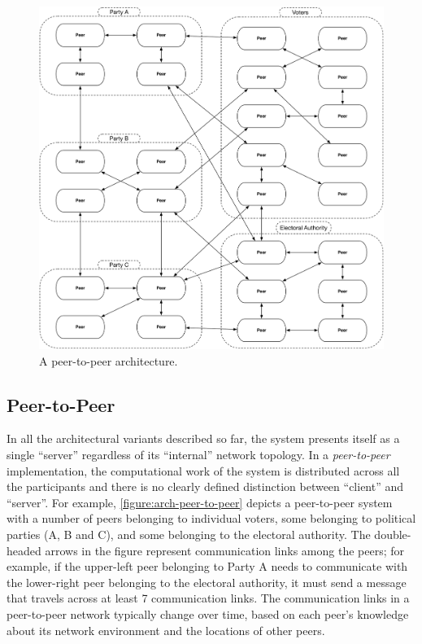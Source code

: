 \begin{figure}[t!]
\begin{center}
\includegraphics[width=6.5in]{architecture_resources/peer-to-peer.pdf}
\end{center}
\caption{A peer-to-peer architecture.}
\label{figure:arch-peer-to-peer}
\end{figure}

\subsection{Peer-to-Peer}

In all the architectural variants described so far, the system
presents itself as a single ``server'' regardless of its ``internal''
network topology. In a \emph{peer-to-peer} implementation, the
computational work of the system is distributed across all the
participants and there is no clearly defined distinction between
``client'' and ``server''. For example,
\autoref{figure:arch-peer-to-peer} depicts a peer-to-peer system with
a number of peers belonging to individual voters, some belonging to
political parties (A, B and C), and some belonging to the electoral
authority. The double-headed arrows in the figure represent
communication links among the peers; for example, if the upper-left
peer belonging to Party A needs to communicate with the lower-right
peer belonging to the electoral authority, it must send a message that
travels across at least 7 communication links. The communication links
in a peer-to-peer network typically change over time, based on each
peer's knowledge about its network environment and the locations of
other peers.

